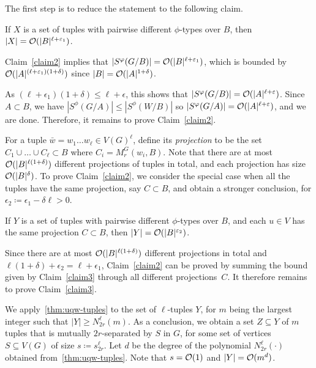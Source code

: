 	\setcounter{claim}{0}
%	
The first step is to reduce the statement to the following claim.

\begin{claim}\label{claim2}
If $X$ is a set of tuples with pairwise different $\phi$-types over $B$, then $|X|=\mathcal{O}(|B|^{\ell+\varepsilon_1})$.
\end{claim}	

Claim~\ref{claim2} implies that $|S^\varphi(G/B)|=\mathcal{O}(|B|^{\ell+\varepsilon_1})$, 
which is bounded by $\mathcal{O}(|A|^{(\ell+\varepsilon_1)(1+\delta)})$ since $|B|=\mathcal{O}(|A|^{1+\delta})$. 

As $(\ell+\epsilon_1)(1+\delta)\le \ell+\epsilon$, this shows that $|S^\varphi(G/B)|=\mathcal{O}(|A|^{\ell+\varepsilon})$.
Since $A\subset B$, 
we have $|S^\phi(G/A)|\le |S^\phi(W/B)|$ so
 $|S^\varphi(G/A)|=\mathcal{O}(|A|^{\ell+\varepsilon})$, and we are done. Therefore, it remains to prove Claim~\ref{claim2}.

\medskip

For a tuple $\bar w=w_1\ldots w_\ell\in V(G)^\ell$, define its \emph{projection}
to be the set $C_1\cup\ldots\cup C_\ell\subset B$ where  
$C_i=M^G_r(w_i, B)$. Note that there are at most 
$\mathcal{O}(|B|^{\ell(1+\delta)})$ different projections of tuples in total, and each projection has size $\mathcal{O}(|B|^\delta)$.
To prove Claim~\ref{claim2}, we consider the special case when all the tuples have the same projection, say $C\subset B$, and  obtain a stronger conclusion,
for $\epsilon_2\coloneqq \epsilon_1-\delta\ell>0$.

\begin{claim}\label{claim3}
If $Y$ is a set of tuples with pairwise different $\phi$-types over $B$, and each $u\in V$ has the same projection $C\subset B$, then $|Y|=\mathcal{O}(|B|^{\varepsilon_2})$.
\end{claim}

Since there are at most $\mathcal{O}(|B|^{\ell(1+\delta)})$ different projections in total and $\ell(1+\delta)+\epsilon_2=\ell+\epsilon_1$, Claim~\ref{claim2} can be proved
by summing the bound given by Claim~\ref{claim3} through all different projections~$C$.
It therefore remains to prove Claim~\ref{claim3}.

\medskip

We apply~\autoref{thm:uqw-tuples} to the set of $\ell$-tuples $Y$, for $m$ being the largest integer such that $|Y|\ge N^{\ell}_{2r}(m)$.
  As a conclusion, we obtain a set $Z\subseteq Y$ of $m$ tuples that is mutually $2r$-separated by $S$ in $G$, for some set of vertices $S\subseteq V(G)$ of size $s\coloneqq s^{\ell}_{2r}$.
  Let $d$ be the degree of the polynomial $N^\ell_{2r}(\cdot)$ obtained from~\autoref{thm:uqw-tuples}.
  Note that $s=\mathcal{O}(1)$ and $|Y|=\mathcal{O}(m^d)$.
    
